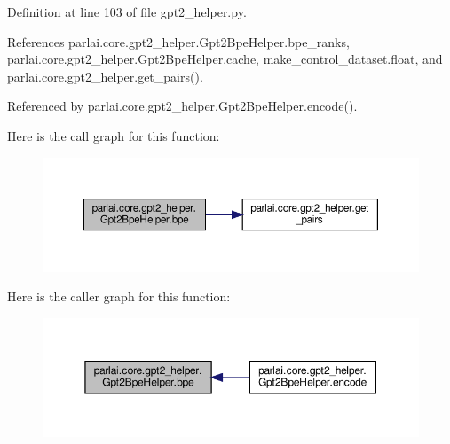 Definition at line 103 of file gpt2\+\_\+helper.\+py.



References parlai.\+core.\+gpt2\+\_\+helper.\+Gpt2\+Bpe\+Helper.\+bpe\+\_\+ranks, parlai.\+core.\+gpt2\+\_\+helper.\+Gpt2\+Bpe\+Helper.\+cache, make\+\_\+control\+\_\+dataset.\+float, and parlai.\+core.\+gpt2\+\_\+helper.\+get\+\_\+pairs().



Referenced by parlai.\+core.\+gpt2\+\_\+helper.\+Gpt2\+Bpe\+Helper.\+encode().

Here is the call graph for this function\+:
\nopagebreak
\begin{figure}[H]
\begin{center}
\leavevmode
\includegraphics[width=350pt]{classparlai_1_1core_1_1gpt2__helper_1_1Gpt2BpeHelper_ac2bbb343b37bc277bf717b87ed675ff9_cgraph}
\end{center}
\end{figure}
Here is the caller graph for this function\+:
\nopagebreak
\begin{figure}[H]
\begin{center}
\leavevmode
\includegraphics[width=350pt]{classparlai_1_1core_1_1gpt2__helper_1_1Gpt2BpeHelper_ac2bbb343b37bc277bf717b87ed675ff9_icgraph}
\end{center}
\end{figure}
\mbox{\label{classparlai_1_1core_1_1gpt2__helper_1_1Gpt2BpeHelper_a54e448f943687a8afe9bcc97741d06b9}} 
